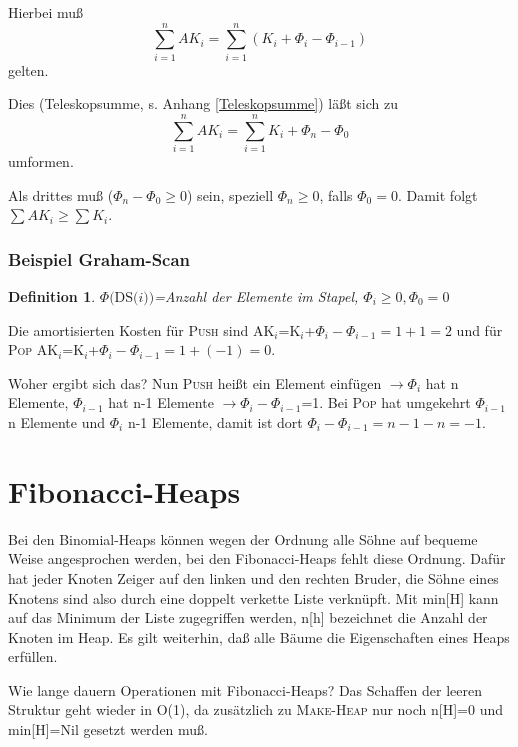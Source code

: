 \documentclass[ngerman,draft,parskip=half*,twoside]{scrreprt}
\theoremstyle{break}
\newtheorem{definition}{Definition}
\begin{document}
Hierbei muß \[\sum_{i=1}^n AK_i=\sum_{i=1}^n (K_i+{\Phi}_i-{\Phi}_{i-1})\] gelten.

Dies (Teleskopsumme, s. Anhang \ref{Teleskopsumme}) läßt sich zu \[\sum_{i=1}^n AK_i=\sum_{i=1}^n
K_i+{\Phi}_n-{\Phi}_0\] umformen.

Als drittes muß (${\Phi}_n-{\Phi}_0 \geq 0$) sein, speziell ${\Phi}_n \geq 0$, falls ${\Phi}_0=0$. Damit folgt
$\sum AK_i \geq \sum K_i$.

\subsubsection{Beispiel Graham-Scan}

\begin{definition}
$\Phi \mbox{(DS(}i\mbox{))}$=Anzahl der Elemente im Stapel, ${\Phi}_i \geq 0, {\Phi}_0=0$
\end{definition}

Die amortisierten Kosten für  \textsc{Push} sind AK$_i$=K$_i$+${\Phi}_i-{\Phi}_{i-1}=1+1=2$
und für  \textsc{Pop} AK$_i$=K$_i$+${\Phi}_i-{\Phi}_{i-1}=1+(-1)=0$.

Woher ergibt sich das? Nun \textsc{Push} heißt ein Element einfügen $\rightarrow {\Phi}_i$ hat n Elemente,
${\Phi}_{i-1}$
 hat n-1 Elemente $ \rightarrow {\Phi}_i-{\Phi}_{i-1}$=1. Bei \textsc{Pop} hat umgekehrt ${\Phi}_{i-1}$ n Elemente und
 ${\Phi}_i $ n-1
Elemente, damit ist dort ${\Phi}_i-{\Phi}_{i-1}=n-1-n=-1$.  

\section{Fibonacci-Heaps}
Bei den Binomial-Heaps können wegen der Ordnung alle Söhne auf bequeme Weise angesprochen werden, bei den
Fibonacci-Heaps fehlt diese Ordnung. Dafür hat jeder Knoten Zeiger auf den linken und den rechten Bruder, die Söhne
eines Knotens sind also durch eine doppelt verkette Liste verknüpft. Mit min[H] kann auf das Minimum der Liste
zugegriffen werden, n[h] bezeichnet die Anzahl der Knoten im Heap. Es gilt weiterhin, daß alle Bäume die
Eigenschaften eines Heaps erfüllen.

Wie lange dauern Operationen mit Fibonacci-Heaps? Das Schaffen der leeren Struktur geht wieder in O(1), da zusätzlich
zu \textsc{Make-Heap} nur noch n[H]=0 und min[H]=Nil gesetzt werden muß.
\end{document}

